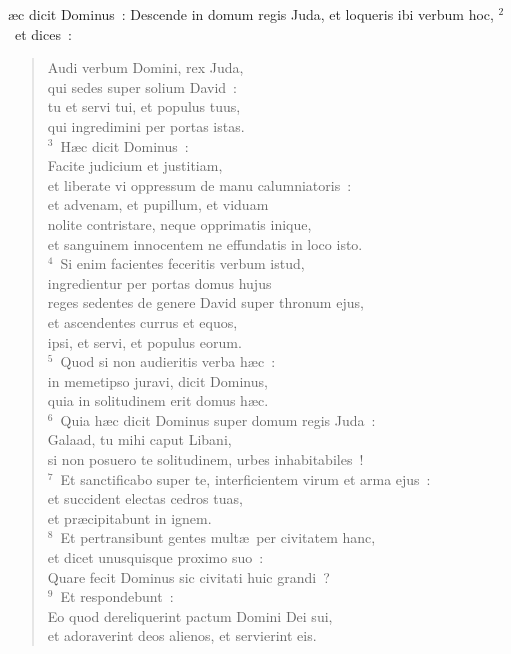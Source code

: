 \bchapter
{}\ae c dicit Dominus~: Descende in domum regis Juda, et loqueris ibi verbum hoc,
${}^{2}$~et dices~: \begin{flushleft}\begin{verse}Audi verbum Domini, rex Juda,\\ qui sedes super solium David~:\\ tu et servi tui, et populus tuus,\\ qui ingredimini per portas istas.\\
${}^{3}$~H\ae c dicit Dominus~:\\ Facite judicium et justitiam,\\ et liberate vi oppressum de manu calumniatoris~:\\ et advenam, et pupillum, et viduam\\ nolite contristare, neque opprimatis inique,\\ et sanguinem innocentem ne effundatis in loco isto.\\
${}^{4}$~Si enim facientes feceritis verbum istud,\\ ingredientur per portas domus hujus\\ reges sedentes de genere David super thronum ejus,\\ et ascendentes currus et equos,\\ ipsi, et servi, et populus eorum.\\
${}^{5}$~Quod si non audieritis verba h\ae c~:\\ in memetipso juravi, dicit Dominus,\\ quia in solitudinem erit domus h\ae c.\\
${}^{6}$~Quia h\ae c dicit Dominus super domum regis Juda~:\\ Galaad, tu mihi caput Libani,\\ si non posuero te solitudinem, urbes inhabitabiles~!\\
${}^{7}$~Et sanctificabo super te, interficientem virum et arma ejus~:\\ et succident electas cedros tuas,\\ et pr\ae cipitabunt in ignem.\\
${}^{8}$~Et pertransibunt gentes mult\ae\ per civitatem hanc,\\ et dicet unusquisque proximo suo~:\\ Quare fecit Dominus sic civitati huic grandi~?\\
${}^{9}$~Et respondebunt~:\\ Eo quod dereliquerint pactum Domini Dei sui,\\ et adoraverint deos alienos, et servierint eis.\\

\end{verse}
\end{flushleft}
